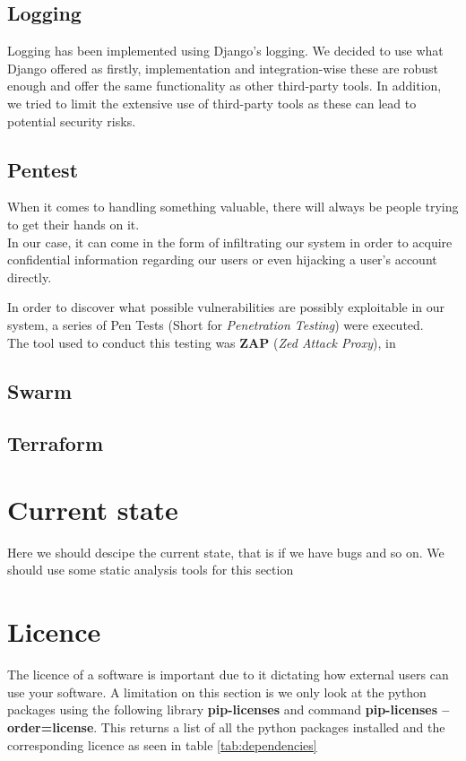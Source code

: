 \subsection*{Logging}
Logging has been implemented using Django's logging. We decided to use what Django offered as firstly, implementation and integration-wise these are robust enough and offer the same functionality as other third-party tools. In addition, we tried to limit the extensive use of third-party tools as these can lead to potential security risks.
\subsection*{Pentest}
When it comes to handling something valuable, there will always be people trying to get their hands on it.\\
In our case, it can come in the form of infiltrating our system in order to acquire confidential information regarding our users or even hijacking a user's account directly.\par
In order to discover what possible vulnerabilities are possibly exploitable in our system, a series of Pen Tests (Short for \textit{Penetration Testing}) were executed.\\
The tool used to conduct this testing was \textbf{ZAP} (\textit{Zed Attack Proxy}), in 

\subsection*{Swarm}

\subsection*{Terraform}


\section*{Current state}

Here we should descipe the current state, that is if we have bugs and so on. We should use some static analysis tools for this section


\section*{Licence}

The licence of a software is important due to it dictating how external users can use your software. A limitation on this section is we only look at the python packages using the following library \textbf{pip-licenses} and command \textbf{ pip-licenses --order=license}. This returns a list of all the python packages installed and the corresponding licence as seen in table \ref{tab:dependencies}

